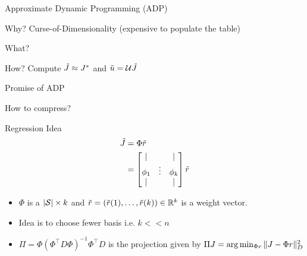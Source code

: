 \documentclass[10pt,handout]{beamer}
\begin{document}
\begin{frame}[fragile]{Approximate Dynamic Programming (ADP)}
\begin{block}{Why?}
Curse-of-Dimensionality (expensive to populate the table)
\end{block}
\begin{block}{What?}
{\color{orange}{ADP= Compression + DP}}
\end{block}
\begin{block}{How?}
Compute $\tj\approx J^*$ and $\tu=\U \tj$
\end{block}
\begin{block}{Promise of ADP \cite{BertB}}
{}
\end{block}
\end{frame}




\begin{frame}[fragile]{How to compress?}
\begin{block}{Regression Idea}
\begin{align*}
\tilde{J}&=\Phi \tr \\
&=\begin{bmatrix}\lvert& &\lvert  \\ \phi_1& \vdots& \phi_k\\ \lvert& & \lvert  \\ \end{bmatrix} \tr
\end{align*}
\end{block}
\begin{itemize}
\item $\Phi$ is a $|\S|\times k $ {\color{orange}{feature matrix}} and $\tr=(\tr(1),\ldots,\tr(k))\in \R^k$ is a weight vector.
\item Idea is to choose fewer basis i.e. $k<<n$
\item $\Pi=\Phi (\Phi^\top D \Phi)^{-1}\Phi^\top D$ is the projection given by $\Pi J =\arg\min_{\Phi r}\norm{J-\Phi r}^2_D$
\end{itemize}

\end{frame}
\end{document}
